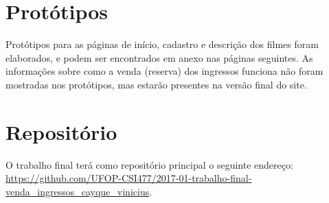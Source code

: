 \documentclass[10pt,a4paper,article]{abntex2}
\begin{document}
	\section{Protótipos}
		  Protótipos para as páginas de início, cadastro e descrição dos filmes foram elaborados, e podem ser encontrados em anexo nas páginas seguintes. As informações sobre como a venda (reserva) dos ingressos funciona não foram mostradas nos protótipos, mas estarão presentes na versão final do site.

	\section{Repositório}

		O trabalho final terá como repositório principal o seguinte endereço: \url{https://github.com/UFOP-CSI477/2017-01-trabalho-final-venda_ingressos_cayque_vinicius}.
\end{document}
